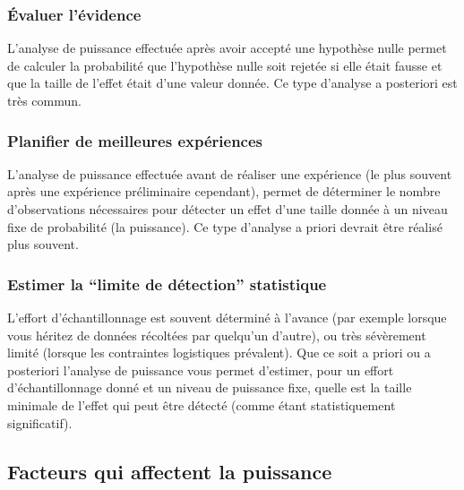 \documentclass[
  12pt,
]{book}
\begin{document}
\hypertarget{uxe9valuer-luxe9vidence}{%
\subsubsection*{Évaluer l'évidence}\label{uxe9valuer-luxe9vidence}}

L'analyse de puissance effectuée après avoir accepté une hypothèse nulle permet de calculer la probabilité que l'hypothèse nulle soit rejetée si elle était fausse et que la taille de l'effet était d'une valeur donnée.
Ce type d'analyse a posteriori est très commun.

\hypertarget{planifier-de-meilleures-expuxe9riences}{%
\subsubsection*{Planifier de meilleures expériences}\label{planifier-de-meilleures-expuxe9riences}}

L'analyse de puissance effectuée avant de réaliser une expérience (le plus souvent après une expérience préliminaire cependant), permet de déterminer le nombre d'observations nécessaires pour détecter un effet d'une taille donnée à un niveau fixe de probabilité (la puissance).
Ce type d'analyse a priori devrait être réalisé plus souvent.

\hypertarget{estimer-la-limite-de-duxe9tection-statistique}{%
\subsubsection*{Estimer la ``limite de détection'' statistique}\label{estimer-la-limite-de-duxe9tection-statistique}}

L'effort d'échantillonnage est souvent déterminé à l'avance (par exemple lorsque vous héritez de données récoltées par quelqu'un d'autre), ou très sévèrement limité (lorsque les contraintes logistiques prévalent).
Que ce soit a priori ou a posteriori l'analyse de puissance vous permet d'estimer, pour un effort d'échantillonnage donné et un niveau de puissance fixe, quelle est la taille minimale de l'effet qui peut être détecté (comme étant statistiquement significatif).

\hypertarget{facteurs-qui-affectent-la-puissance}{%
\subsection{Facteurs qui affectent la puissance}\label{facteurs-qui-affectent-la-puissance}}
\end{document}
